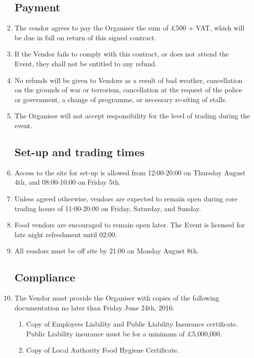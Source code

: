 \begin{enumerate}

\subsection*{Payment}
\item The vendor agrees to pay the Organiser the sum of £500 + VAT, which will be due in
      full on return of this signed contract.
\item If the Vendor fails to comply with this contract, or does not attend the Event,
        they shall not be entitled to any refund.
\item No refunds will be given to Vendors as a result of bad weather, cancellation on the
        grounds of war or terrorism, cancellation at the request of the police or government,
        a change of programme, or necessary re-siting of stalls.
\item The Organiser will not accept responsibility for the level of trading during the event.

\subsection*{Set-up and trading times}
\item Access to the site for set-up is allowed from 12:00-20:00 on Thursday August 4th, and
        08:00-10:00 on Friday 5th.
\item Unless agreed otherwise, vendors are expected to remain open during core trading
        hours of 11:00-20:00 on Friday, Saturday, and Sunday.
\item Food vendors are encouraged to remain open later. The Event is licensed for late
        night refreshment until 02:00.
\item All vendors must be off site by 21:00 on Monday August 8th.

\subsection*{Compliance}
\item The Vendor must provide the Organiser with copies of the following documentation no later
        than Friday June 24th, 2016:
\begin{enumerate}
    \item Copy of Employers Liability and Public Liability Insurance certificate.
            Public Liability insurance must be for a minimum of £5,000,000.
    \item Copy of Local Authority Food Hygiene Certificate.
\end{enumerate}


\end{enumerate}
